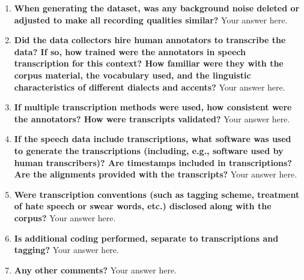 \documentclass{article}
\begin{document}
    \noindent{}
    \begin{enumerate}[leftmargin=0.65cm]
        \scriptsize
        \item \textbf{When generating the dataset, was any background noise deleted or adjusted to make all recording qualities similar?} 
        \newline 
        Your answer here.
        \newline 
        
        \item \textbf{Did the data collectors hire human annotators to transcribe the data? If so, how trained were the annotators in speech transcription for this context? How familiar were they with the corpus material, the vocabulary used, and the linguistic characteristics of different dialects and accents?}
        \newline 
        Your answer here.
        \newline 
        
        \item \textbf{If multiple transcription methods were used, how consistent were the annotators? How were transcripts validated? }
        \newline 
        Your answer here.
        \newline 
        
        \item \textbf{If the speech data include transcriptions, what software was used to generate the transcriptions (including, e.g., software used by human transcribers)? Are timestamps included in transcriptions? Are the alignments provided with the transcripts?}
        \newline 
        Your answer here.
        \newline 
        
        \item \textbf{Were transcription conventions (such as tagging scheme, treatment of hate speech or swear words, etc.) disclosed along with the corpus?}
        \newline 
        Your answer here.
        \newline 
        
        \item \textbf{Is additional coding performed, separate to transcriptions and tagging?}
        \newline 
        Your answer here.
        \newline 
        
        \item \textbf{Any other comments?}
        \newline 
        Your answer here.
        \newline 
    \end{enumerate}
    \noindent{}
   
\end{document}
